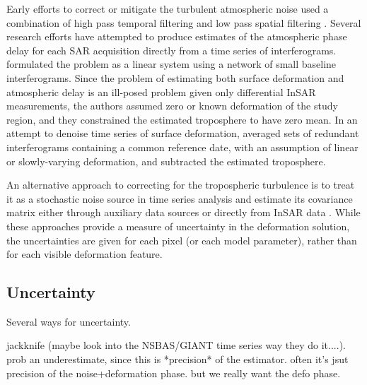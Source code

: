 \documentclass{utexasthesis}
\begin{document}
Early efforts to correct or mitigate the turbulent atmospheric noise used a combination of high pass temporal filtering and low pass spatial filtering \citep{Ferretti2001PermanentScatterersSar, Berardino2002NewAlgorithmSurface}.
Several research efforts have attempted to produce estimates of the atmospheric phase delay for each SAR acquisition directly from a time series of interferograms. \citep{Liu2012SatelliteRadarInterferometry} formulated the problem as a linear system using a network of small baseline interferograms. Since the problem of estimating both surface deformation and atmospheric delay is an ill-posed problem given only differential InSAR measurements, the authors assumed zero or known deformation of the study region, and they constrained the estimated troposphere to have zero mean. In an attempt to denoise time series of surface deformation, \citep{Tymofyeyeva2015MitigationAtmosphericPhase} averaged sets of redundant interferograms containing a common reference date, with an assumption of linear or slowly-varying deformation, and subtracted the estimated troposphere.

An alternative approach to correcting for the tropospheric turbulence is to treat it as a stochastic noise source in time series analysis \citep{Simons2007InterferometricSyntheticAperture, Agram2015NoiseModelInsar} and estimate its covariance matrix either through auxiliary data sources \citep{Barnhart2013CharacterizingEstimatingNoise, Parker2015SystematicAssessmentAtmospheric} or directly from InSAR data \citep{Lohman2005SomeThoughtsUse}. While these approaches provide a measure of uncertainty in the deformation solution, the uncertainties are given for each pixel (or each model parameter), rather than for each visible deformation feature.




\subsection{Uncertainty}

Several ways for uncertainty.

jackknife (maybe look into the NSBAS/GIANT time series way they do it....). prob an underestimate, since this is *precision* of the estimator. often it's jsut precision of the noise+deformation phase. but we really want the defo phase.
\end{document}
